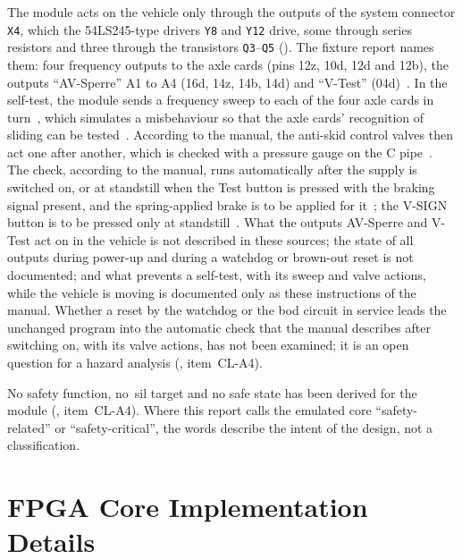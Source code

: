 The module acts on the vehicle only through the outputs of the system connector \texttt{X4}, which the 54LS245-type drivers \texttt{Y8} and \texttt{Y12} drive, some through series resistors and three through the transistors \texttt{Q3}--\texttt{Q5} (). The fixture report names them: four frequency outputs to the axle cards (pins 12z, 10d, 12d and 12b), the outputs \enquote{AV-Sperre} A1 to A4 (16d, 14z, 14b, 14d) and \enquote{V-Test} (04d)~\cite[Sec.~5.1.5, 5.2]{dolata2023}. In the self-test, the module sends a frequency sweep to each of the four axle cards in turn~\cite[Sec.~5.1.5]{dolata2023}, which simulates a misbehaviour so that the axle cards' recognition of sliding can be tested~\cite[Sec.~2.9]{leyer2023}. According to the manual, the anti-skid control valves then act one after another, which is checked with a pressure gauge on the C pipe~\cite[Blatt~18/25]{rexroth1992wsp}. The check, according to the manual, runs automatically after the supply is switched on, or at standstill when the Test button is pressed with the braking signal present, and the spring-applied brake is to be applied for it~\cite[Blatt~14/25]{rexroth1992wsp}; the V-SIGN button is to be pressed only at standstill~\cite[Blatt~19/25]{rexroth1992wsp}. What the outputs AV-Sperre and V-Test act on in the vehicle is not described in these sources; the state of all outputs during power-up and during a watchdog or brown-out reset is not documented; and what prevents a self-test, with its sweep and valve actions, while the vehicle is moving is documented only as these instructions of the manual. Whether a reset by the watchdog or the \gls{bod} circuit in service leads the unchanged program into the automatic check that the manual describes after switching on, with its valve actions, has not been examined; it is an open question for a hazard analysis (, item~CL-A4).

No safety function, no~\gls{sil} target and no safe state has been derived for the module (, item~CL-A4). Where this report calls the emulated core \enquote{safety-related} or \enquote{safety-critical}, the words describe the intent of the design, not a classification.

\section{FPGA Core Implementation Details}
\label{sec:fpga_core_details}


